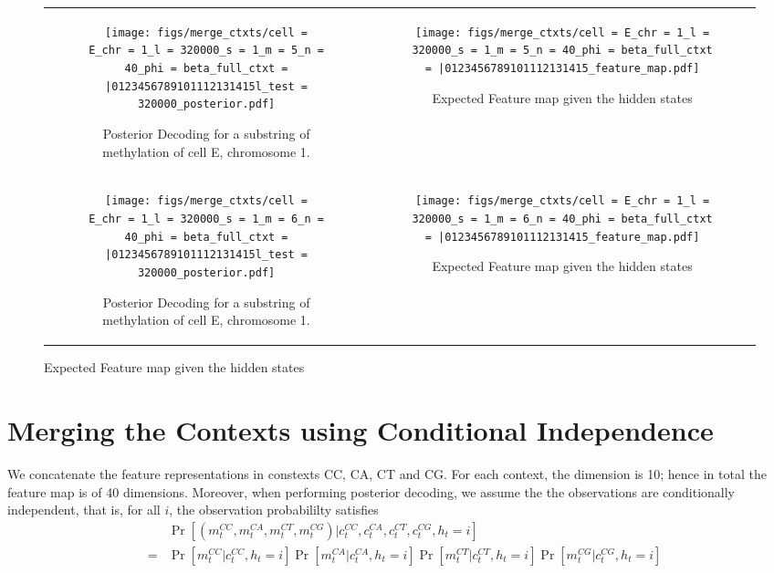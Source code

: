 \documentclass{article}
\begin{document}
  \begin{figure}[H]
      \begin{tabular}{cc}
        \begin{subfigure}[t]{0.4\textwidth}
          \texttt{[image: figs/merge\_ctxts/cell = E\_chr = 1\_l = 320000\_s = 1\_m = 5\_n = 40\_phi = beta\_full\_ctxt = |0123456789101112131415l\_test = 320000\_posterior.pdf]}
          \caption{Posterior Decoding for a substring of methylation of cell E, chromosome 1.}
        \end{subfigure}
        &
        \begin{subfigure}[t]{0.4\textwidth}
          \texttt{[image: figs/merge\_ctxts/cell = E\_chr = 1\_l = 320000\_s = 1\_m = 5\_n = 40\_phi = beta\_full\_ctxt = |0123456789101112131415\_feature\_map.pdf]}
          \caption{Expected Feature map given the hidden states}
        \end{subfigure}
      \\
      \begin{subfigure}[t]{0.4\textwidth}
        \texttt{[image: figs/merge\_ctxts/cell = E\_chr = 1\_l = 320000\_s = 1\_m = 6\_n = 40\_phi = beta\_full\_ctxt = |0123456789101112131415l\_test = 320000\_posterior.pdf]}
        \caption{Posterior Decoding for a substring of methylation of cell E, chromosome 1.}
      \end{subfigure}
      &
      \begin{subfigure}[t]{0.4\textwidth}
        \texttt{[image: figs/merge\_ctxts/cell = E\_chr = 1\_l = 320000\_s = 1\_m = 6\_n = 40\_phi = beta\_full\_ctxt = |0123456789101112131415\_feature\_map.pdf]}
        \caption{Expected Feature map given the hidden states}
      \end{subfigure}
    \end{tabular}
\end{figure}

\section{Merging the Contexts using Conditional Independence}

We concatenate the feature representations in constexts CC, CA, CT and CG. For each
context, the dimension is 10; hence in total the feature map is of 40 dimensions.
Moreover, when performing posterior decoding, we assume the the observations are
conditionally independent, that is, for all $i$, the observation probabililty satisfies
\begin{eqnarray*}
  &&\Pr[(m_t^{CC}, m_t^{CA}, m_t^{CT}, m_t^{CG}) | c_t^{CC}, c_t^{CA}, c_t^{CT}, c_t^{CG}, h_t = i] \\
  &=&
  \Pr[m_t^{CC} | c_t^{CC}, h_t = i] \Pr[m_t^{CA} | c_t^{CA}, h_t = i] \Pr[m_t^{CT} | c_t^{CT}, h_t = i] \Pr[m_t^{CG} | c_t^{CG}, h_t = i]
\end{eqnarray*}
\end{document}
